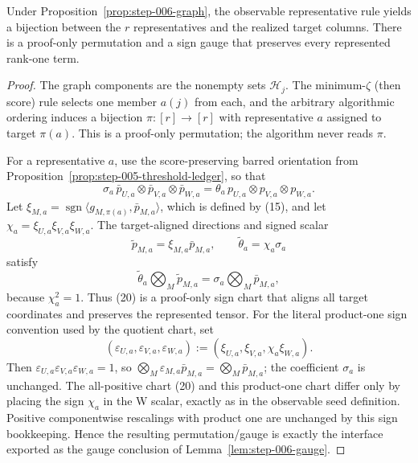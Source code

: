 \begin{lemma}\label{lem:step-006-gauge}
Under Proposition~\ref{prop:step-006-graph},
the observable representative rule yields a bijection between the \(r\)
representatives and the realized target columns. There is a proof-only
permutation and a sign gauge that preserves every represented rank-one term.

\begin{proof}
The graph components are the nonempty sets \(\mathcal H_j\). The
minimum-\(\zeta\) (then score) rule selects one member \(a(j)\) from each,
and the arbitrary algorithmic ordering induces a bijection
\(\pi:[r]\to[r]\) with representative \(a\) assigned to target
\(\pi(a)\). This is a proof-only permutation; the algorithm never reads
\(\pi\).

For a representative \(a\), use the score-preserving barred orientation from
Proposition~\ref{prop:step-005-threshold-ledger}, so that
\[
 \sigma_a\,\bar p_{U,a}\otimes\bar p_{V,a}\otimes\bar p_{W,a}
 =\theta_a\,p_{U,a}\otimes p_{V,a}\otimes p_{W,a}. \tag{19}
\]
Let \(\xi_{M,a}=\operatorname{sgn}\langle g_{M,\pi(a)},\bar p_{M,a}\rangle\),
which is defined by (15), and let \(\chi_a=\xi_{U,a}\xi_{V,a}\xi_{W,a}\).
The target-aligned directions and signed scalar
\[
 \widetilde p_{M,a}=\xi_{M,a}\bar p_{M,a},\qquad
 \widetilde\theta_a=\chi_a\sigma_a \tag{20}
\]
satisfy
\[
 \widetilde\theta_a\bigotimes_M\widetilde p_{M,a}
 =\sigma_a\bigotimes_M\bar p_{M,a}, \tag{21}
\]
because \(\chi_a^2=1\). Thus (20) is a proof-only sign chart that aligns
all target coordinates and preserves the represented tensor. For the literal
product-one sign convention used by the quotient chart, set
\[
 (\varepsilon_{U,a},\varepsilon_{V,a},\varepsilon_{W,a})
 :=(\xi_{U,a},\xi_{V,a},\chi_a\xi_{W,a}).
\]
Then \(\varepsilon_{U,a}\varepsilon_{V,a}\varepsilon_{W,a}=1\), so
\(\bigotimes_M\varepsilon_{M,a}\bar p_{M,a}
=\bigotimes_M\bar p_{M,a}\); the coefficient \(\sigma_a\) is unchanged.
The all-positive chart (20) and this product-one chart differ only by
placing the sign \(\chi_a\) in the W scalar, exactly as in the observable
seed definition. Positive componentwise rescalings with product one are
unchanged by this sign bookkeeping. Hence the resulting permutation/gauge is
exactly the interface exported as the gauge conclusion of Lemma~\ref{lem:step-006-gauge}. 

\end{proof}
\end{lemma}
